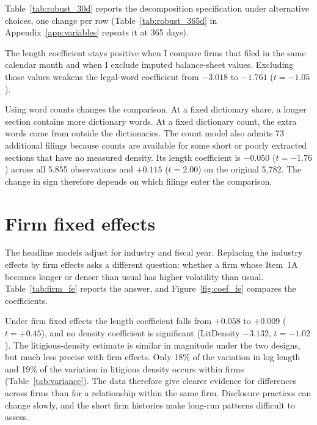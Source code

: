 Table~\ref{tab:robust_30d} reports the decomposition specification under
alternative choices, one change per row (Table~\ref{tab:robust_365d} in
Appendix~\ref{app:variables} repeats it at 365 days).



The length coefficient stays positive when I compare firms that filed in the same calendar month and when I exclude imputed balance-sheet values. Excluding those values weakens the legal-word coefficient from $-3.018$ to $-1.761$ ($t=-1.05$).

Using word counts changes the comparison. At a fixed dictionary share, a longer section contains more dictionary words. At a fixed dictionary count, the extra words come from outside the dictionaries. The count model also admits 73 additional filings because counts are available for some short or poorly extracted sections that have no measured density. Its length coefficient is $-0.050$ ($t=-1.76$) across all 5{,}855 observations and $+0.115$ ($t=2.00$) on the original 5{,}782. The change in sign therefore depends on which filings enter the comparison.




\section{Firm fixed effects}
\label{sec:robustness_firmfe}

The headline models adjust for industry and fiscal year. Replacing the
industry effects by firm effects asks a different question: whether a firm
whose Item~1A becomes longer or denser than usual has higher volatility
than usual. Table~\ref{tab:firm_fe} reports the answer, and
Figure~\ref{fig:coef_fe} compares the coefficients.



Under firm fixed effects the length coefficient falls from $+0.058$ to
$+0.009$ ($t = +0.45$), and no density coefficient is significant
(LitDensity $-3.132$, $t = -1.02$). The litigious-density estimate is similar 
in magnitude under the two designs, but much less precise with firm effects. 
Only 18\% of the variation in log length and 19\% of the variation in litigious 
density occurs within firms (Table~\ref{tab:variance}). The data therefore give 
clearer evidence for differences across firms than for a relationship within the 
same firm. Disclosure practices can change slowly, and the short firm histories make long-run patterns difficult to assess.

